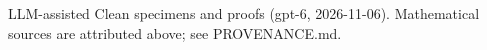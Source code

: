 \documentclass[11pt]{article}
\begin{document}

\bigskip
{\footnotesize LLM-assisted Clean specimens and proofs (gpt-6, 2026-11-06).
Mathematical sources are attributed above; see PROVENANCE.md.}
\end{document}
